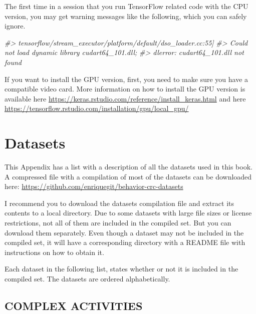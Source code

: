 \documentclass[
  11pt,
]{krantz}
\makeatletter
\newenvironment{Shaded}{\begin{snugshade}}{\end{snugshade}}
\newcommand{\CommentTok}[1]{\textcolor[rgb]{0.37,0.37,0.37}{\textit{#1}}}
\newenvironment{kframe}{%
\medskip{}
\setlength{\fboxsep}{.8em}
 \def\at@end@of@kframe{}%
 \ifinner\ifhmode%
  \def\at@end@of@kframe{\end{minipage}}%
  \begin{minipage}{\columnwidth}%
 \fi\fi%
 \def\FrameCommand##1{\hskip\@totalleftmargin \hskip-\fboxsep
 \colorbox{shadecolor}{##1}\hskip-\fboxsep
     \hskip-\linewidth \hskip-\@totalleftmargin \hskip\columnwidth}%
 \MakeFramed {\advance\hsize-\width
   \@totalleftmargin\z@ \linewidth\hsize
   \@setminipage}}%
 {\par\unskip\endMakeFramed%
 \at@end@of@kframe}
\newenvironment{rmdblock}[1]
  {
  \begin{itemize}
  \renewcommand{\labelitemi}{
    \raisebox{-.7\height}[0pt][0pt]{
      {\setkeys{Gin}{width=3em,keepaspectratio}\texttt{[image: images/icons/\#1]}}
    }
  }
  \setlength{\fboxsep}{1em}
  \begin{kframe}
  \item
  }
  {
  \end{kframe}
  \end{itemize}
  }
\newenvironment{rmdinfo}
  {\begin{rmdblock}{info}}
  {\end{rmdblock}}
\makeatother
\begin{document}
The first time in a session that you run TensorFlow related code with the CPU version, you may get warning messages like the following, which you can safely ignore.

\begin{Shaded}
\begin{Highlighting}[]
\CommentTok{\#\textgreater{} tensorflow/stream\_executor/platform/default/dso\_loader.cc:55]}
\CommentTok{\#\textgreater{} Could not load dynamic library \textquotesingle{}cudart64\_101.dll\textquotesingle{};}
\CommentTok{\#\textgreater{} dlerror: cudart64\_101.dll not found}
\end{Highlighting}
\end{Shaded}

\begin{rmdinfo}
If you want to install the GPU version, first, you need to make sure you have a compatible video card. More information on how to install the GPU version is available here \url{https://keras.rstudio.com/reference/install_keras.html} and here \url{https://tensorflow.rstudio.com/installation/gpu/local_gpu/}
\end{rmdinfo}

\hypertarget{appendixDatasets}{%
\chapter{Datasets}\label{appendixDatasets}}

This Appendix has a list with a description of all the datasets used in this book. A compressed file with a compilation of most of the datasets can be downloaded here: \url{https://github.com/enriquegit/behavior-crc-datasets}

I recommend you to download the datasets compilation file and extract its contents to a local directory. Due to some datasets with large file sizes or license restrictions, not all of them are included in the compiled set. But you can download them separately. Even though a dataset may not be included in the compiled set, it will have a corresponding directory with a README file with instructions on how to obtain it.

Each dataset in the following list, states whether or not it is included in the compiled set. The datasets are ordered alphabetically.

\hypertarget{complex-activities}{%
\section{COMPLEX ACTIVITIES}\label{complex-activities}}
\end{document}
